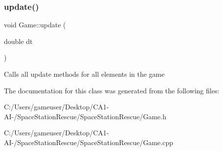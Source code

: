 \mbox{\label{class_game_aa8c8ca9efb596230614be2f2f9e61b86}} 
\subsubsection{\texorpdfstring{update()}{update()}}
{\footnotesize\ttfamily void Game\+::update (\begin{DoxyParamCaption}\item[{double}]{dt }\end{DoxyParamCaption})\hspace{0.3cm}{\ttfamily [private]}}



Calls all update methods for all elements in the game 



The documentation for this class was generated from the following files\+:\begin{DoxyCompactItemize}
\item 
C\+:/\+Users/gameuser/\+Desktop/\+C\+A1-\/\+A\+I-\//\+Space\+Station\+Rescue/\+Space\+Station\+Rescue/Game.\+h\item 
C\+:/\+Users/gameuser/\+Desktop/\+C\+A1-\/\+A\+I-\//\+Space\+Station\+Rescue/\+Space\+Station\+Rescue/Game.\+cpp\end{DoxyCompactItemize}
